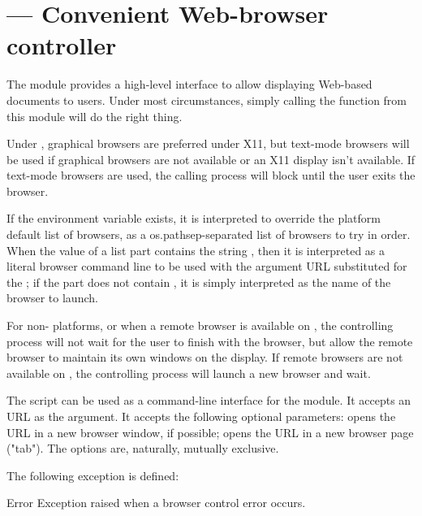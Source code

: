 \section{ ---
         Convenient Web-browser controller}


The  module provides a high-level interface to
allow displaying Web-based documents to users. Under most
circumstances, simply calling the  function from this
module will do the right thing.

Under \UNIX{}, graphical browsers are preferred under X11, but text-mode
browsers will be used if graphical browsers are not available or an X11
display isn't available.  If text-mode browsers are used, the calling
process will block until the user exits the browser.

If the environment variable  exists, it
is interpreted to override the platform default list of browsers, as a
os.pathsep-separated list of browsers to try in order.  When the value of
a list part contains the string , then it is interpreted as
a literal browser command line to be used with the argument URL
substituted for the ; if the part does not contain
, it is simply interpreted as the name of the browser to
launch.

For non-\UNIX{} platforms, or when a remote browser is available on
\UNIX{}, the controlling process will not wait for the user to finish
with the browser, but allow the remote browser to maintain its own
windows on the display.  If remote browsers are not available on \UNIX{},
the controlling process will launch a new browser and wait.

The script  can be used as a command-line interface
for the module. It accepts an URL as the argument. It accepts the following
optional parameters:  opens the URL in a new browser window,
if possible;  opens the URL in a new browser page ("tab"). The
options are, naturally, mutually exclusive.

The following exception is defined:

\begin{excdesc}{Error}
  Exception raised when a browser control error occurs.
\end{excdesc}

